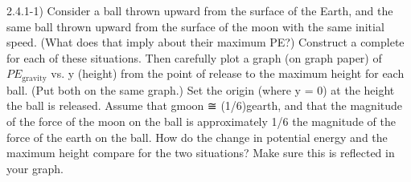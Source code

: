 \label{fnt2.4.1-1}
  
2.4.1-1) Consider a ball thrown upward from the surface of the Earth, and the same ball thrown upward from the surface of the moon with the same initial speed. (What does that imply about their maximum PE?) Construct a complete \EnergyDiagram{} for each of these situations. Then carefully plot a graph (on graph paper) of $PE_\text{gravity}$ vs. y (height) from the point of release to the maximum height for each ball. (Put both on the same graph.) Set the origin (where y = 0) at the height the ball is released. Assume that gmoon ≅ (1/6)gearth,  and that the magnitude of the force of the moon on the ball is approximately 1/6 the magnitude of the force of the earth on the ball. 
How do the change in potential energy and the maximum height compare for the two situations? Make sure this is reflected in your graph. 